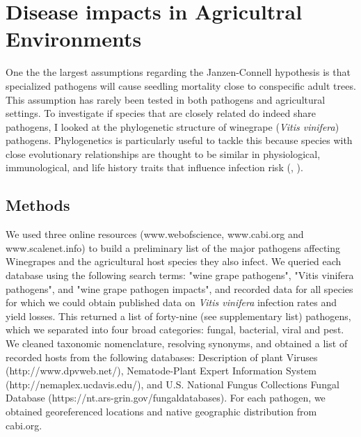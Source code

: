 \documentclass{article}
\begin{document}
\section{Disease impacts in Agricultral Environments}
One the the largest assumptions regarding the Janzen-Connell hypothesis is that specialized pathogens will cause seedling mortality close to conspecific adult trees. This assumption has rarely been tested in both pathogens and agricultural settings. To investigate if species that are closely related do indeed share pathogens, I looked at the phylogenetic structure of winegrape (\textit{Vitis vinifera}) pathogens. Phylogenetics is particularly useful to tackle this because species with close evolutionary relationships are thought to be similar in physiological, immunological, and life history traits that influence infection risk (\citep{Davies2008}, \citep{Gilbert2007}). 

\subsection{Methods}
We used three online resources (www.webofscience, www.cabi.org and www.scalenet.info) to build a preliminary list of the major pathogens affecting Winegrapes and the agricultural host species they also infect. We queried each database using the following search terms: "wine grape pathogens", "Vitis vinifera pathogens", and "wine grape pathogen impacts", and recorded data for all species for which we could obtain published data on \textit{Vitis vinifera} infection rates and yield losses. This returned a list of forty-nine (see supplementary list) pathogens, which we separated into four broad categories: fungal, bacterial, viral and pest. We cleaned taxonomic nomenclature, resolving synonyms, and obtained a list of recorded hosts from the following databases: Description of plant Viruses (http://www.dpvweb.net/), Nematode-Plant Expert Information System (http://nemaplex.ucdavis.edu/), and  U.S. National Fungus Collections Fungal Database (https://nt.ars-grin.gov/fungaldatabases). For each pathogen, we obtained georeferenced locations and native geographic distribution from cabi.org.
\end{document}
